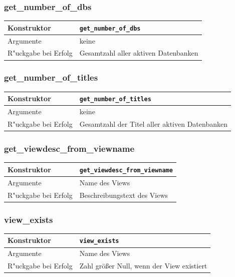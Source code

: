 \documentclass[11pt, twoside, a4paper, BCOR8mm, DIV12, bibtotoc,idxtotoc]{scrbook}
\begin{document}
\subsubsection{get\_number\_of\_dbs}
\begin{shadowenv}
\begin{tabular}{lp{10cm}}
  Konstruktor & \texttt{get\_number\_of\_dbs}\\
  \hline
  Argumente     & keine\\
  R"uckgabe bei Erfolg & Gesamtzahl aller aktiven Datenbanken\\
\end{tabular}
\end{shadowenv}

\subsubsection{get\_number\_of\_titles}
\begin{shadowenv}
\begin{tabular}{lp{10cm}}
  Konstruktor & \texttt{get\_number\_of\_titles}\\
  \hline
  Argumente     & keine\\
  R"uckgabe bei Erfolg & Gesamtzahl der Titel aller aktiven Datenbanken\\
\end{tabular}
\end{shadowenv}

\subsubsection{get\_viewdesc\_from\_viewname}
\begin{shadowenv}
\begin{tabular}{lp{10cm}}
  Konstruktor & \texttt{get\_viewdesc\_from\_viewname}\\
  \hline
  Argumente     & Name des Views\\
  R"uckgabe bei Erfolg & Beschreibungstext des Views\\
\end{tabular}
\end{shadowenv}

\subsubsection{view\_exists}
\begin{shadowenv}
\begin{tabular}{lp{10cm}}
  Konstruktor & \texttt{view\_exists}\\
  \hline
  Argumente     & Name des Views\\
  R"uckgabe bei Erfolg & Zahl größer Null, wenn der View existiert\\
\end{tabular}
\end{shadowenv}
\end{document}
